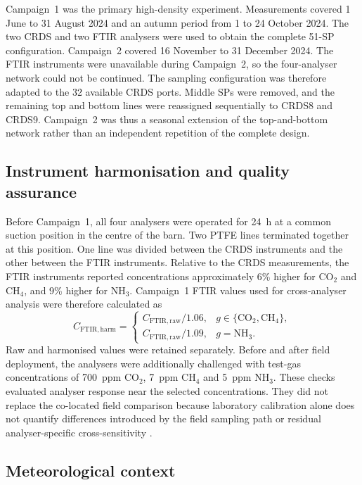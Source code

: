 \documentclass[12pt,a4paper]{article}
\begin{document}
Campaign~1 was the primary high-density experiment. Measurements covered 1 June to 31 August 2024 and an autumn period from 1 to 24 October 2024. The two CRDS and two FTIR analysers were used to obtain the complete 51-SP configuration. Campaign~2 covered 16 November to 31 December 2024. The FTIR instruments were unavailable during Campaign~2, so the four-analyser network could not be continued. The sampling configuration was therefore adapted to the 32 available CRDS ports. Middle SPs were removed, and the remaining top and bottom lines were reassigned sequentially to CRDS8 and CRDS9. Campaign~2 was thus a seasonal extension of the top-and-bottom network rather than an independent repetition of the complete design.

\subsection{Instrument harmonisation and quality assurance}

Before Campaign~1, all four analysers were operated for \SI{24}{h} at a common suction position in the centre of the barn. Two PTFE lines terminated together at this position. One line was divided between the CRDS instruments and the other between the FTIR instruments. Relative to the CRDS measurements, the FTIR instruments reported concentrations approximately 6\% higher for \(\mathrm{CO_2}\) and \(\mathrm{CH_4}\), and 9\% higher for \(\mathrm{NH_3}\). Campaign~1 FTIR values used for cross-analyser analysis were therefore calculated as
\begin{equation}
C_{\mathrm{FTIR,harm}}=
\begin{cases}
C_{\mathrm{FTIR,raw}}/1.06, & g\in\{\mathrm{CO_2},\mathrm{CH_4}\},\\
C_{\mathrm{FTIR,raw}}/1.09, & g=\mathrm{NH_3}.
\end{cases}
\end{equation}
Raw and harmonised values were retained separately. Before and after field deployment, the analysers were additionally challenged with test-gas concentrations of \SI{700}{ppm} \(\mathrm{CO_2}\), \SI{7}{ppm} \(\mathrm{CH_4}\) and \SI{5}{ppm} \(\mathrm{NH_3}\). These checks evaluated analyser response near the selected concentrations. They did not replace the co-located field comparison because laboratory calibration alone does not quantify differences introduced by the field sampling path or residual analyser-specific cross-sensitivity \citep{Zhuang2020}.

\subsection{Meteorological context}
\end{document}
